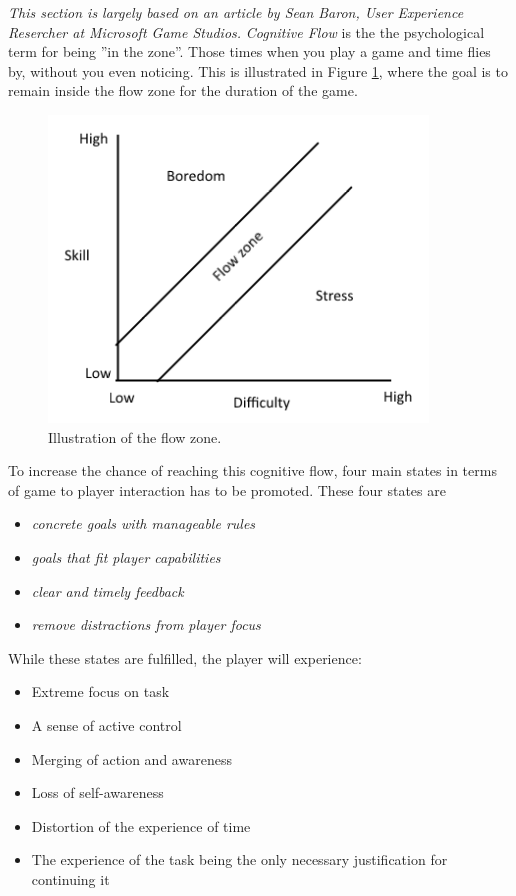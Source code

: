 \emph{This section is largely based on an article by Sean Baron, User Experience Resercher at Microsoft Game
Studios\cite{baron}.}
\emph{Cognitive Flow} is the the psychological term for being ''in the zone''. Those times when you play a game and
time flies by, without you even noticing.  This is illustrated in Figure \ref{gamedesign:flowzone}, where the goal is
to remain inside the flow zone for the duration of the game.
\begin{figure}
    \includegraphics{figures/gamedesign/flowZone}
    \caption{Illustration of the flow zone.}
    \label{gamedesign:flowzone}
\end{figure}

To increase the chance of reaching this cognitive flow, four main states in terms of game to player interaction has to
be promoted.  These four states are 
\begin{itemize}
    \item \emph{concrete goals with manageable rules}
    \item \emph{goals that fit player capabilities}
    \item \emph{clear and timely feedback}
    \item \emph{remove distractions from player focus}
\end{itemize} While these states are fulfilled, the player will experience:

\begin{itemize}
    \item Extreme focus on task
    \item A sense of active control
    \item Merging of action and awareness
    \item Loss of self-awareness
    \item Distortion of the experience of time
    \item The experience of the task being the only necessary justification for continuing it
\end{itemize}

